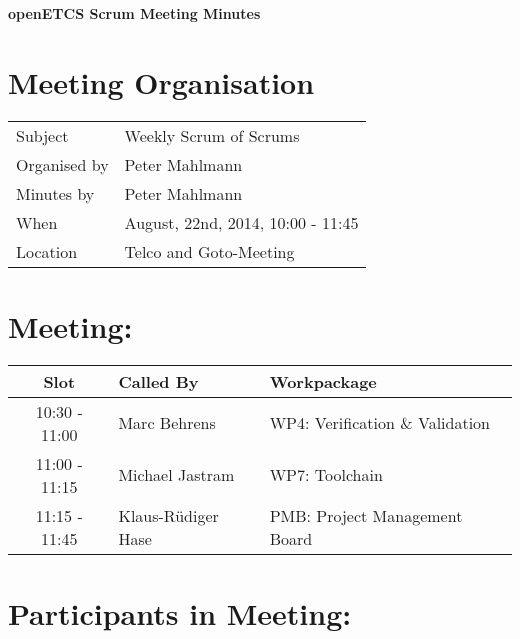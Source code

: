\documentclass[a4paper, 11pt]{article}
\begin{document}
{\begin{center}\huge\bf openETCS Scrum Meeting Minutes\end{center}}
\section{Meeting Organisation}

\renewcommand{\arraystretch}{1.5}
\begin{supertabular}{m{.2\textwidth}m{.8\textwidth}}
Subject & Weekly Scrum of Scrums\\
Organised by & Peter Mahlmann\\
Minutes by & Peter Mahlmann\\
When & August, 22nd, 2014, 10:00 - 11:45\\
Location & Telco and Goto-Meeting\\
\end{supertabular}

\renewcommand{\arraystretch}{1.0}
\section{Meeting:}

\begin{tabular}{|c|l|l|}
\hline
\textbf{Slot} &  \textbf{Called By} & \textbf{Workpackage} \\
\hline  
10:30 - 11:00 & Marc Behrens & WP4: Verification \& Validation \\\hline  
11:00 - 11:15 & Michael Jastram & WP7: Toolchain \\\hline
11:15 - 11:45 & Klaus-R\"udiger Hase & PMB: Project Management Board \\\hline  
\end{tabular}

\section{Participants in Meeting:}
\end{document}

